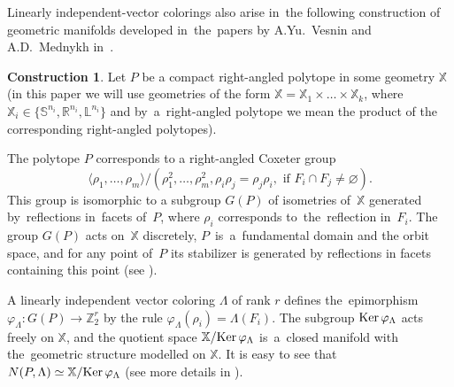 \documentclass[12pt]{amsart}
\theoremstyle{definition}
\newtheorem{construction}[formula]{Construction}
\theoremstyle{remark}
\begin{document}
Linearly independent-vector colorings also arise in~the following construction of geometric
manifolds developed in~the~papers by A.Yu.~Vesnin and A.D.~Mednykh in~\cite{MV86, V87, M90, VM99M, V17}.
\begin{construction}\label{MVconstr}
Let $P$ be a compact right-angled polytope in some geometry $\mathbb X$ (in this paper we will 
use geometries of the form $\mathbb X= \mathbb X_1\times\dots\times \mathbb X_k$, where $\mathbb X_i\in \{\mathbb S^{n_i},\mathbb R^{n_i},\mathbb L^{n_i}\}$ and by~a~right-angled polytope we mean the product of the corresponding right-angled polytopes). 

The polytope $P$ corresponds to a right-angled Coxeter group 
$$
\langle \rho_1,\dots,\rho_m\rangle/(\rho_1^2,\dots,\rho_m^2, \rho_i\rho_j=\rho_j\rho_i,
\text{ if }F_i\cap F_j\ne\varnothing).
$$
This group is isomorphic to a subgroup $G(P)$ of isometries of~$\mathbb X$ generated by~reflections in~facets of~$P$,
where $\rho_i$ corresponds to~the~reflection in~$F_i$. The group $G(P)$ acts on~$\mathbb X$ discretely, 
$P$~is~a~fundamental domain and the orbit space, and for any point of~$P$ its stabilizer is generated by reflections in facets containing this point (see \cite[Theorem 1.2 in Chapter 5]{VS88}).

A linearly independent vector coloring $\Lambda$ of rank $r$ defines 
the~epimorphism $\varphi_{\Lambda}\colon G(P)\to \mathbb Z_2^r$
by the rule $\varphi_{\Lambda}(\rho_i)=\Lambda(F_i)$.  
The subgroup ${\rm Ker\,} \varphi_{\Lambda}$ acts freely on $\mathbb X$, 
and the quotient space $\mathbb X/{\rm Ker\,} \varphi_{\Lambda}$ is~a~closed manifold with the~geometric structure modelled on $\mathbb X$. It is easy to 
see that $N(P,\Lambda)\simeq \mathbb X/{\rm Ker\,} \varphi_{\Lambda}$ (see more details in \cite[Construction 4.11]{E22M}).
\end{construction}
\end{document}

